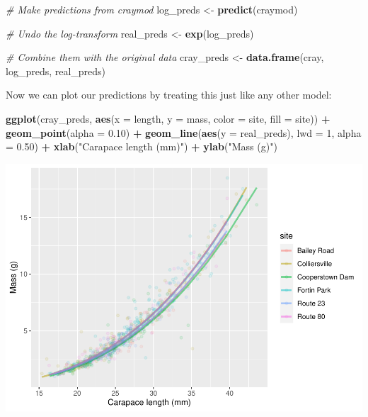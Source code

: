 \documentclass[
]{book}
\newenvironment{Shaded}{\begin{snugshade}}{\end{snugshade}}
\newcommand{\CommentTok}[1]{\textcolor[rgb]{0.56,0.35,0.01}{\textit{#1}}}
\newcommand{\DataTypeTok}[1]{\textcolor[rgb]{0.13,0.29,0.53}{#1}}
\newcommand{\DecValTok}[1]{\textcolor[rgb]{0.00,0.00,0.81}{#1}}
\newcommand{\FloatTok}[1]{\textcolor[rgb]{0.00,0.00,0.81}{#1}}
\newcommand{\KeywordTok}[1]{\textcolor[rgb]{0.13,0.29,0.53}{\textbf{#1}}}
\newcommand{\NormalTok}[1]{#1}
\newcommand{\OperatorTok}[1]{\textcolor[rgb]{0.81,0.36,0.00}{\textbf{#1}}}
\newcommand{\StringTok}[1]{\textcolor[rgb]{0.31,0.60,0.02}{#1}}
\begin{document}
\begin{Shaded}
\begin{Highlighting}[]
\CommentTok{# Make predictions from craymod}
\NormalTok{log_preds <-}\StringTok{ }\KeywordTok{predict}\NormalTok{(craymod)}

\CommentTok{# Undo the log-transform}
\NormalTok{real_preds <-}\StringTok{ }\KeywordTok{exp}\NormalTok{(log_preds)}

\CommentTok{# Combine them with the original data}
\NormalTok{cray_preds <-}\StringTok{ }\KeywordTok{data.frame}\NormalTok{(cray, log_preds, real_preds)}
\end{Highlighting}
\end{Shaded}

Now we can plot our predictions by treating this just like any other model:

\begin{Shaded}
\begin{Highlighting}[]
\KeywordTok{ggplot}\NormalTok{(cray_preds, }\KeywordTok{aes}\NormalTok{(}\DataTypeTok{x =}\NormalTok{ length, }\DataTypeTok{y =}\NormalTok{ mass, }\DataTypeTok{color =}\NormalTok{ site, }\DataTypeTok{fill =}\NormalTok{ site)) }\OperatorTok{+}
\StringTok{  }\KeywordTok{geom_point}\NormalTok{(}\DataTypeTok{alpha =} \FloatTok{0.10}\NormalTok{) }\OperatorTok{+}
\StringTok{  }\KeywordTok{geom_line}\NormalTok{(}\KeywordTok{aes}\NormalTok{(}\DataTypeTok{y =}\NormalTok{ real_preds), }\DataTypeTok{lwd =} \DecValTok{1}\NormalTok{, }\DataTypeTok{alpha =} \FloatTok{0.50}\NormalTok{) }\OperatorTok{+}
\StringTok{  }\KeywordTok{xlab}\NormalTok{(}\StringTok{"Carapace length (mm)"}\NormalTok{) }\OperatorTok{+}
\StringTok{  }\KeywordTok{ylab}\NormalTok{(}\StringTok{"Mass (g)"}\NormalTok{)}
\end{Highlighting}
\end{Shaded}

\includegraphics{worstr_files/figure-latex/unnamed-chunk-381-1.pdf}
\end{document}
